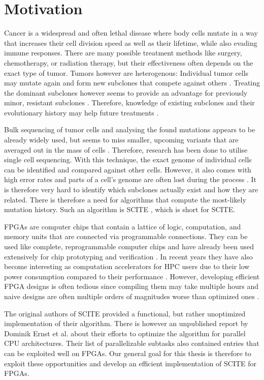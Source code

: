 \section{Motivation}

Cancer is a widespread and often lethal disease\cite{10.1001/jamaoncol.2021.6987} where body cells mutate in a way that increases their cell division speed as well as their lifetime, while also evading immune responses. There are many possible treatment methods like surgery, chemotherapy, or radiation therapy, but their effectiveness often depends on the exact type of tumor. Tumors however are heterogenous: Individual tumor cells may mutate again and form new subclones that compete against others \cite{nik2012life}. Treating the dominant subclones however seems to provide an advantage for previously minor, resistant subclones \cite{gillies2012evolutionary}. Therefore, knowledge of existing subclones and their evolutionary history may help future treatments \cite{greaves2012clonal, stratton2009cancer, swanton2012intratumor}.

Bulk sequencing of tumor cells and analysing the found mutations appears to be already widely used, but seems to miss smaller, upcoming variants that are averaged out in the mass of cells \cite{navin2014cancer}. Therefore, research has been done to utilise single cell sequencing. With this technique, the exact genome of individual cells can be identified and compared against other cells. However, it also comes with high error rates and parts of a cell's genome are often lost during the process \cite{tree2016}. It is therefore very hard to identify which subclones actually exist and how they are related. There is therefore a need for algorithms that compute the most-likely mutation history. Such an algorithm is \acs{SCITE} \cite{tree2016}, which is short for \acl{SCITE}.

\acp{FPGA} are computer chips that contain a lattice of logic, computation, and memory units that are connected via programmable connections. They can be used like complete, reprogrammable computer chips and have already been used extensively for chip prototyping and verification \cite{rodriguez2007features}. In recent years they have also become interesting as computation accelerators for \ac{HPC} users due to their low power consumption compared to their performance \cite{betkaoui2010comparing}. However, developing efficient \ac{FPGA} designs is often tedious since compiling them may take multiple hours and naive designs are often multiple orders of magnitudes worse than optimized ones \cite{betkaoui2010comparing}.

The original authors of \ac{SCITE} provided a functional, but rather unoptimized implementation of their algorithm. There is however an unpublished report by Dominik Ernst et al. \cite{ernst2020Performance} about their efforts to optimize the algorithm for parallel CPU architectures. Their list of parallelizable subtasks also contained entries that can be exploited well on \acp{FPGA}. Our general goal for this thesis is therefore to exploit these opportunities and develop an efficient implementation of \ac{SCITE} for \acp{FPGA}. 